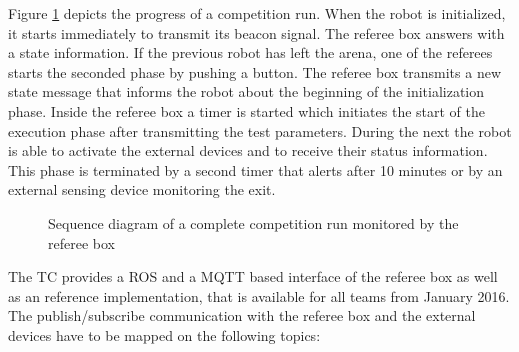 Figure \ref{fig:refbox} depicts the progress of a competition run. When the robot is initialized, it starts immediately to transmit its beacon signal. The referee box answers with a state information. If the previous robot has left the arena, one of the referees starts the seconded phase by pushing a button. The referee box transmits a new state message that informs the robot about the beginning of the initialization phase. Inside the referee box a timer is started which initiates the start of the execution phase after transmitting the test parameters. During the next  the robot is able to activate the external devices and to receive their status information. This phase is terminated by a second timer that alerts after 10 minutes or by an external sensing device monitoring the exit.

\begin{figure}
\centering

\caption{Sequence diagram of a complete competition run monitored by the referee box}
\label{fig:refbox}
\end{figure}
\par
The TC provides a ROS and a MQTT based interface of the referee box as well as an reference implementation, that is available for all teams from January 2016.
The publish/subscribe communication with the referee box and the external devices have to be mapped on the following topics:

